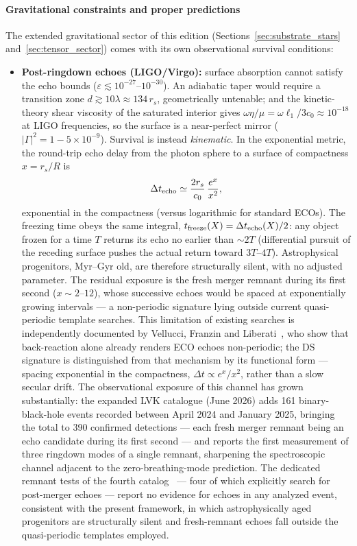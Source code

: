 \documentclass[11pt,a4paper]{article}
\theoremstyle{plain}
\theoremstyle{remark}
\begin{document}
\paragraph{Gravitational constraints and proper predictions}
The extended gravitational sector of this edition (Sections~\ref{sec:substrate_stars} and~\ref{sec:tensor_sector}) comes with its own observational survival conditions:
\begin{itemize}
    \item \textbf{Post-ringdown echoes (LIGO/Virgo):} surface absorption cannot satisfy the echo bounds ($\varepsilon \lesssim 10^{-27}$--$10^{-30}$). An adiabatic taper would require a transition zone $d \gtrsim 10\lambda \approx 134\,r_s$, geometrically untenable; and the kinetic-theory shear viscosity of the saturated interior gives $\omega\eta/\mu = \omega\ell_1/3c_0 \approx 10^{-18}$ at LIGO frequencies, so the surface is a near-perfect mirror ($|\Gamma|^2 = 1 - 5\times10^{-9}$). Survival is instead \emph{kinematic}. In the exponential metric, the round-trip echo delay from the photon sphere to a surface of compactness $x = r_s/R$ is
    \begin{equation}
    \Delta t_{\rm echo} \simeq \frac{2 r_s}{c_0}\,\frac{e^{x}}{x^{2}},
    \end{equation}
    exponential in the compactness (versus logarithmic for standard ECOs). The freezing time obeys the same integral, $t_{\rm freeze}(X) = \Delta t_{\rm echo}(X)/2$: any object frozen for a time $T$ returns its echo no earlier than $\sim 2T$ (differential pursuit of the receding surface pushes the actual return toward $3T$--$4T$). Astrophysical progenitors, Myr--Gyr old, are therefore structurally silent, with no adjusted parameter. The residual exposure is the fresh merger remnant during its first second ($x \sim 2$--$12$), whose successive echoes would be spaced at exponentially growing intervals --- a non-periodic signature lying outside current quasi-periodic template searches. This limitation of existing searches is independently documented by Vellucci, Franzin and Liberati~\cite{vellucci2022}, who show that back-reaction alone already renders ECO echoes non-periodic; the DS signature is distinguished from that mechanism by its functional form --- spacing exponential in the compactness, $\Delta t \propto e^x/x^2$, rather than a slow secular drift. The observational exposure of this channel has grown substantially: the expanded LVK catalogue (June 2026) adds 161 binary-black-hole events recorded between April 2024 and January 2025, bringing the total to 390 confirmed detections --- each fresh merger remnant being an echo candidate during its first second --- and reports the first measurement of three ringdown modes of a single remnant, sharpening the spectroscopic channel adjacent to the zero-breathing-mode prediction. The dedicated remnant tests of the fourth catalog~\cite{lvk_tgr4_iii} --- four of which explicitly search for post-merger echoes --- report no evidence for echoes in any analyzed event, consistent with the present framework, in which astrophysically aged progenitors are structurally silent and fresh-remnant echoes fall outside the quasi-periodic templates employed.

\end{itemize}
\end{document}
